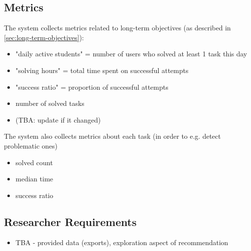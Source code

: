 \subsection{Metrics}
\label{sec:robomission.metrics}

The system collects metrics related to long-term objectives (as described in \ref{sec:long-term-objectives}):

\begin{itemize}
\item "daily active students" = number of users who solved at least 1 task this day
\item "solving hours" = total time spent on successful attempts
\item "success ratio" = proportion of successful attempts
\item number of solved tasks
\item (TBA: update if it changed)
\end{itemize}


The system also collects metrics about each task (in order to e.g. detect problematic ones)
\begin{itemize}
\item solved count
\item median time
\item success ratio
\end{itemize}


\subsection{Researcher Requirements}
\begin{itemize}
\item TBA - provided data (exports), exploration aspect of recommendation
\end{itemize}





%


